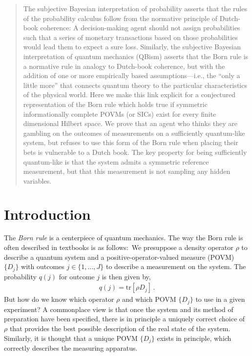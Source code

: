 \documentclass[%
 reprint,superscriptaddress,
 amsmath,amssymb,
 aps,pra, onecolumn, 12pt
]{revtex4-2}
\newcommand{\eqn}[1]{\begin{eqnarray} #1 \end{eqnarray}}
\newcommand{\tit}[1]{\textit{#1}}
\newcommand{\tr}[1]{  \textrm{tr}\left[ #1 \right]  }
\begin{document}
\begin{abstract}
\small\baselineskip=14pt
The subjective Bayesian interpretation of probability asserts that the rules of the probability calculus follow from the normative principle of Dutch-book coherence: A decision-making agent should not assign probabilities such that a series of monetary transactions based on those probabilities would lead them to expect a sure loss. Similarly, the subjective Bayesian interpretation of quantum mechanics (QBism) asserts that the Born rule is a normative rule in analogy to Dutch-book coherence, but with the addition of one or more empirically based assumptions---i.e., the ``only a little more'' that connects quantum theory to the particular characteristics of the physical world. Here we make this link explicit for a conjectured representation of the Born rule which holds true if symmetric informationally complete POVMs (or SICs) exist for every finite dimensional Hilbert space.  We prove that an agent who thinks they are gambling on the outcomes of measurements on a sufficiently quantum-like system, but refuses to use this form of the Born rule when placing their bets is vulnerable to a Dutch book.  The key property for being sufficiently quantum-like is that the system admits a symmetric reference measurement, but that this measurement is not sampling any hidden variables.
\end{abstract}

\maketitle

\section{Introduction}

The \tit{Born rule} is a centerpiece of quantum mechanics. The way the Born rule is often described in textbooks is as follows:\ We presuppose a density operator $\rho$ to describe a quantum system and a positive-operator-valued measure (POVM) $\{ D_j\}$ with outcomes $j \in \{1,\dots,J \}$ to describe a measurement on the system. The probability $q(j)$ for outcome $j$ is then given by,
\eqn{ \label{eqn:Born}
q(j) = \tr{\rho D_j} \, .
}
But how do we know which operator $\rho$ and which POVM $\{ D_j \}$ to use in a given experiment? A commonplace view is that once the system and its method of preparation have been specified, there is in principle a uniquely correct choice of $\rho$ that provides the best possible description of the real state of the system. Similarly, it is thought that a unique POVM $\{ D_j \}$ exists in principle, which correctly describes the measuring apparatus.
\end{document}
